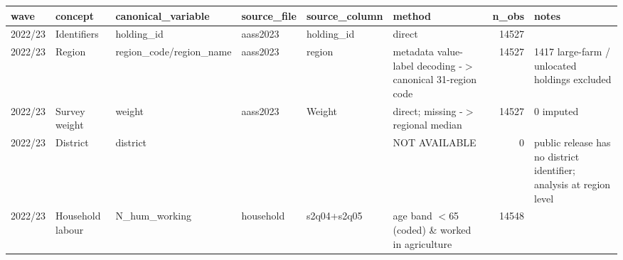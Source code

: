 \begin{tabular}{llllllrl}
\toprule
 wave            & concept                   & canonical\_variable        & source\_file                      & source\_column                             & method                                                                                                       &   n\_obs & notes                                                                                          \\
\midrule
 2022/23         & Identifiers               & holding\_id                & aass2023                         & holding\_id                                & direct                                                                                                       &   14527 &                                                                                                \\
 2022/23         & Region                    & region\_code/region\_name   & aass2023                         & region                                    & metadata value-label decoding -\ensuremath{>} canonical 31-region code                                                    &   14527 & 1417 large-farm / unlocated holdings excluded                                                  \\
 2022/23         & Survey weight             & weight                    & aass2023                         & Weight                                    & direct; missing -\ensuremath{>} regional median                                                                           &   14527 & 0 imputed                                                                                      \\
 2022/23         & District                  & district                  &                                  &                                           & NOT AVAILABLE                                                                                                &       0 & public release has no district identifier; analysis at region level                            \\
 2022/23         & Household labour          & N\_hum\_working             & household                        & s2q04+s2q05                               & age band \ensuremath{<}65 (coded) \& worked in agriculture                                                                 &   14548 &                                                                                                \\

\end{tabular}

